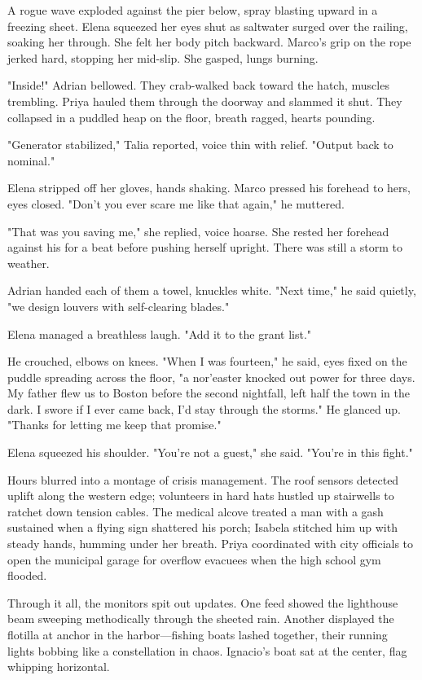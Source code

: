 A rogue wave exploded against the pier below, spray blasting upward in a freezing sheet. Elena squeezed her eyes shut as saltwater surged over the railing, soaking her through. She felt her body pitch backward. Marco's grip on the rope jerked hard, stopping her mid-slip. She gasped, lungs burning.

"Inside!" Adrian bellowed. They crab-walked back toward the hatch, muscles trembling. Priya hauled them through the doorway and slammed it shut. They collapsed in a puddled heap on the floor, breath ragged, hearts pounding.

"Generator stabilized," Talia reported, voice thin with relief. "Output back to nominal."

Elena stripped off her gloves, hands shaking. Marco pressed his forehead to hers, eyes closed. "Don't you ever scare me like that again," he muttered.

"That was you saving me," she replied, voice hoarse. She rested her forehead against his for a beat before pushing herself upright. There was still a storm to weather.

Adrian handed each of them a towel, knuckles white. "Next time," he said quietly, "we design louvers with self-clearing blades."

Elena managed a breathless laugh. "Add it to the grant list."

He crouched, elbows on knees. "When I was fourteen," he said, eyes fixed on the puddle spreading across the floor, "a nor'easter knocked out power for three days. My father flew us to Boston before the second nightfall, left half the town in the dark. I swore if I ever came back, I'd stay through the storms." He glanced up. "Thanks for letting me keep that promise."

Elena squeezed his shoulder. "You're not a guest," she said. "You're in this fight."

\bigskip

Hours blurred into a montage of crisis management. The roof sensors detected uplift along the western edge; volunteers in hard hats hustled up stairwells to ratchet down tension cables. The medical alcove treated a man with a gash sustained when a flying sign shattered his porch; Isabela stitched him up with steady hands, humming under her breath. Priya coordinated with city officials to open the municipal garage for overflow evacuees when the high school gym flooded.

Through it all, the monitors spit out updates. One feed showed the lighthouse beam sweeping methodically through the sheeted rain. Another displayed the flotilla at anchor in the harbor—fishing boats lashed together, their running lights bobbing like a constellation in chaos. Ignacio's boat sat at the center, flag whipping horizontal.

